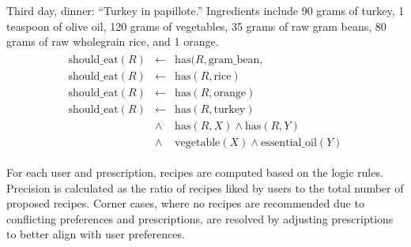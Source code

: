\begin{prescriptions}
\begin{align*}
\begin{array}{rcl}
    \end{array}
  \end{align*}
  \item Third day, dinner: ``Turkey in papillote.'' Ingredients include 90 grams of turkey, 1 teaspoon of olive oil, 120 grams of vegetables, 35 grams of raw gram beans, 80 grams of raw wholegrain rice, and 1 orange.
  \begin{align*}
    \begin{array}{rcl}
      \text{should\_eat}(R) & \leftarrow & \text{has}(R, \text{gram\_bean}, \\
      \text{should\_eat}(R) & \leftarrow & \text{has}(R, \text{rice}) \\
      \text{should\_eat}(R) & \leftarrow & \text{has}(R, \text{orange}) \\
      \text{should\_eat}(R) & \leftarrow & \text{has}(R, \text{turkey}) \\
                            & \land & \text{has}(R, X) \land \text{has}(R, Y) \\
                            & \land & \text{vegetable}(X) \land \text{essential\_oil}(Y)
    \end{array}
  \end{align*}
\end{prescriptions}
%
For each user and prescription, recipes are computed based on the logic rules.
%
Precision is calculated as the ratio of recipes liked by users to the total number of proposed recipes.
%
Corner cases, where no recipes are recommended due to conflicting preferences and prescriptions, are resolved by adjusting prescriptions to better align with user preferences.


